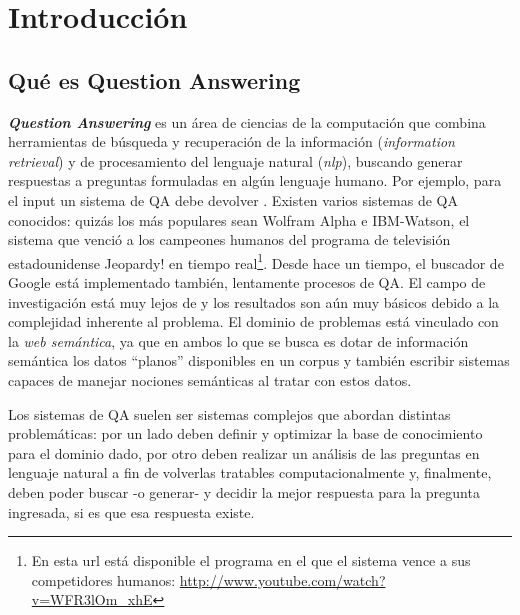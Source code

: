 
\chapter{Introducción}
\label{chap:intro}


\section{Qué es Question Answering} 
\horrible
\textbf{\textit{Question Answering}} es un área de ciencias de la computación que combina herramientas de búsqueda y recuperación
de la información (\textit{information retrieval}) y de procesamiento del lenguaje natural (\textit{nlp}), buscando
generar respuestas a preguntas formuladas en algún lenguaje humano.
Por ejemplo, para el input \textit{} un sistema de QA debe devolver . 
Existen varios sistemas de QA conocidos: quizás los más populares sean Wolfram Alpha e IBM-Watson, el sistema que venció a los campeones humanos del 
programa de televisión estadounidense Jeopardy! en tiempo real\footnote{En esta url está disponible el programa en el que el sistema vence a sus competidores humanos: \url{http://www.youtube.com/watch?v=WFR3lOm_xhE}}. Desde hace un tiempo, el buscador de Google está implementado también, lentamente
procesos de QA. El campo de investigación está muy lejos de  y los resultados son aún muy básicos debido a la complejidad inherente al problema. 
El dominio de problemas está  vinculado con la \textit{web semántica}, ya que en ambos lo que se busca es dotar de
información semántica los datos {\textquotedblleft}planos{\textquotedblright} disponibles en un corpus y
también escribir sistemas capaces de manejar nociones semánticas al tratar con estos datos. 



Los sistemas de QA suelen ser sistemas complejos que abordan distintas
problemáticas: por un lado deben definir y optimizar la base de
conocimiento para el dominio dado, por otro deben realizar un
análisis de las preguntas en lenguaje natural a fin de volverlas
tratables computacionalmente y, finalmente, deben poder buscar -o generar- y
decidir la mejor respuesta para la pregunta ingresada, si es que esa
respuesta existe.


